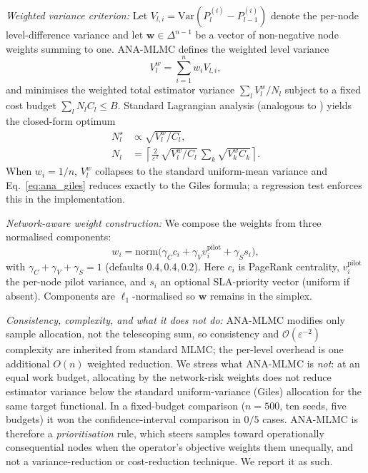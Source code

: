 \documentclass{ieeeaccess}
\begin{document}
\textit{Weighted variance criterion:}
Let $V_{l,i} = \mathrm{Var}(P_l^{(i)} - P_{l-1}^{(i)})$ denote the per-node level-difference
variance and let $\mathbf{w} \in \Delta^{n-1}$ be a vector of non-negative node weights summing to one.
ANA-MLMC defines the weighted level variance
\begin{equation}
    V_l^{w} = \sum_{i=1}^{n} w_i V_{l,i},
    \label{eq:ana_var}
\end{equation}
and minimises the weighted total estimator variance $\sum_l V_l^{w}/N_l$ subject to a fixed cost
budget $\sum_l N_l C_l \leq B$. Standard Lagrangian analysis (analogous to
\cite{giles2015multilevel}) yields the closed-form optimum
\begin{align}
    N_l^{\star} &\propto \sqrt{V_l^{w}/C_l}, \nonumber \\
    N_l &= \left\lceil \frac{2}{\varepsilon^{2}}\,
    \sqrt{V_l^{w}/C_l}\, \sum_k \sqrt{V_k^{w} C_k} \right\rceil .
    \label{eq:ana_giles}
\end{align}
When $w_i=1/n$, $V_l^{w}$ collapses to the standard uniform-mean variance and
Eq.~\eqref{eq:ana_giles} reduces exactly to the Giles formula; a regression test enforces this
in the implementation.

\textit{Network-aware weight construction:}
We compose the weights from three normalised components:
\begin{equation}
    w_i = \mathrm{norm}\bigl(\gamma_C c_i
                + \gamma_V v_i^{\text{pilot}}
                + \gamma_S s_i\bigr),
    \label{eq:ana_weights}
\end{equation}
with $\gamma_C+\gamma_V+\gamma_S=1$ (defaults $0.4,0.4,0.2$). Here $c_i$ is PageRank centrality,
$v_i^{\text{pilot}}$ the per-node pilot variance, and $s_i$ an optional SLA-priority vector
(uniform if absent). Components are $\ell_1$-normalised so $\mathbf{w}$ remains in the simplex.

\textit{Consistency, complexity, and what it does not do:}
ANA-MLMC modifies only sample allocation, not the telescoping sum, so consistency and
$\mathcal{O}(\varepsilon^{-2})$ complexity are inherited from standard MLMC; the per-level
overhead is one additional $O(n)$ weighted reduction. We stress what ANA-MLMC is \emph{not}: at
an equal work budget, allocating by the network-risk weights does not reduce estimator variance
below the standard uniform-variance (Giles) allocation for the same target functional. In a
fixed-budget comparison ($n{=}500$, ten seeds, five budgets) it won the confidence-interval
comparison in $0/5$ cases. ANA-MLMC is therefore a \emph{prioritisation} rule, which steers samples
toward operationally consequential nodes when the operator's objective weights them
unequally, and not a variance-reduction or cost-reduction technique. We report it as such.
\end{document}
